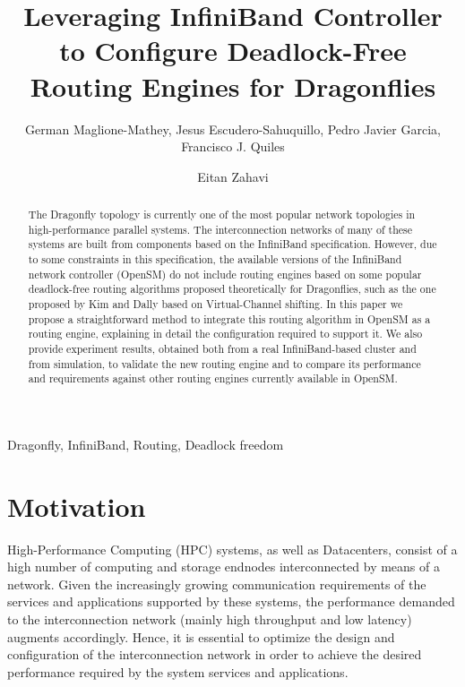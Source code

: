 \documentclass[review]{elsarticle}
\newcommand{\dflys}{Dragonflies}
\newcommand{\dfly}{Dragonfly}
\newcommand{\ibl}{InfiniBand}
\begin{document}
\begin{frontmatter}

\title{Leveraging InfiniBand Controller to Configure Deadlock-Free Routing Engines for \dflys{}}

\author{German Maglione-Mathey, Jesus Escudero-Sahuquillo, Pedro Javier Garcia, Francisco J. Quiles}
\address{Departamento de Sistemas Informáticos, Universidad de Castilla-La Mancha, Spain}

\author{Eitan Zahavi}
\address{Mellanox Technologies, Israel}

\begin{abstract}
The \dfly{} topology is currently one of the most popular network topologies in high-performance parallel systems.
The interconnection networks of many of these systems are built from components based on the \ibl{} specification.
However, due to some constraints in this specification, the available versions of the \ibl{} network controller (OpenSM) do not include
routing engines based on some popular deadlock-free routing algorithms proposed theoretically for \dflys{},
such as the one proposed by Kim and Dally based on Virtual-Channel shifting.
In this paper we propose a straightforward method to integrate this routing algorithm in OpenSM as a routing engine,
explaining in detail the configuration required to support it.
We also provide experiment results, obtained both from a real \ibl-based cluster and from simulation, to validate
the new routing engine and to compare its performance and requirements against other routing engines currently available in OpenSM.
\end{abstract}

\begin{keyword}
Dragonfly, InfiniBand, Routing, Deadlock freedom
\end{keyword}

\end{frontmatter}


\section{Motivation}
\label{s_motivation}

High-Performance Computing (HPC) systems, as well as Datacenters, consist of a high number of computing and storage endnodes interconnected by means of a network.
Given the increasingly growing communication requirements of the services and applications supported by these systems,
the performance demanded to the interconnection network (mainly high throughput and low latency) augments accordingly.
Hence, it is essential to optimize the design and configuration of the interconnection network in order to achieve the desired performance required by the system services and applications.
\end{document}

